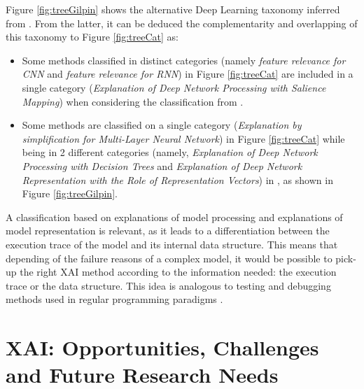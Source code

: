\documentclass[final]{elsarticle}
\begin{document}
Figure \ref{fig:treeGilpin} shows the alternative Deep Learning taxonomy inferred from \cite{Gilpin18}. From the latter, it can be deduced the complementarity and overlapping of this taxonomy to Figure \ref{fig:treeCat} as:
\begin{itemize}[leftmargin=*]
    \item Some methods \cite{InsideConv, ExplainingRNN} classified in distinct categories (namely \textit{feature relevance for CNN} and \textit{feature relevance for RNN}) in Figure \ref{fig:treeCat} are included in a single category (\textit{Explanation of Deep Network Processing with Salience Mapping}) when considering the classification from \cite{Gilpin18}. 
    \item Some methods \cite{augasta2012reverse, kim2017interpretability} are classified on a single category (\textit{Explanation by simplification for Multi-Layer Neural Network}) in Figure \ref{fig:treeCat} while being in 2 different categories (namely, \textit{Explanation of Deep Network Processing with Decision Trees} and \textit{Explanation of Deep Network Representation with the Role of Representation Vectors}) in \cite{Gilpin18}, as shown in Figure \ref{fig:treeGilpin}.
\end{itemize}

A classification based on explanations of model processing and explanations of model representation is relevant, as it leads to a differentiation between the execution trace of the model and its internal data structure. This means that depending of the failure reasons of a complex model, it would be possible to pick-up the right XAI method according to the information needed: the execution trace or the data structure. This idea is analogous to testing and debugging methods used in regular programming paradigms \cite{Hofer06}.

\section{XAI: Opportunities, Challenges and {\color{black}Future} Research Needs} \label{sec:challenges}
\end{document}
